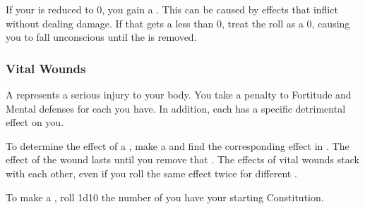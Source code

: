             If your  is reduced to 0, you gain a .
            This can be caused by effects that inflict  without dealing damage.
            If that  gets a  less than 0, treat the roll as a 0, causing you to fall unconscious until the  is removed.

        \subsubsection{Vital Wounds}\label{Vital Wounds}
            A  represents a serious injury to your body.
            You take a  penalty to Fortitude and Mental defenses for each  you have.
            In addition, each  has a specific detrimental effect on you.

            To determine the effect of a , make a  and find the corresponding effect in .
            The effect of the wound lasts until you remove that .
            The effects of vital wounds stack with each other, even if you roll the same effect twice for different .

            \label{Wound Roll}
            To make a , roll 1d10 \sub the number of  you have \add your starting Constitution.

